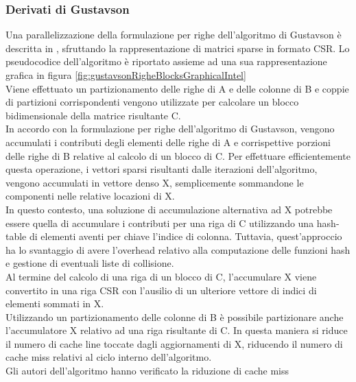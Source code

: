 \subsubsection{Derivati di Gustavson} \label{ssec:gustavsonDerivate}
Una parallelizzazione della formulazione per righe dell'algoritmo di Gustavson è
descritta in \cite{intelSpMMDenseAccumulator}, sfruttando la
rappresentazione di matrici sparse in formato CSR.  \label{ssec:intelSpMMDenseAccumulator}
Lo pseudocodice dell'algoritmo è riportato assieme ad una sua rappresentazione grafica 
in figura \ref{fig:gustavsonRigheBlocksGraphicalIntel}\\
Viene effettuato un partizionamento delle righe di A e delle colonne di B e 
coppie di partizioni corrispondenti vengono utilizzate per calcolare un
blocco bidimensionale della matrice risultante C.\\
\voidLine
In accordo con la formulazione per righe dell'algoritmo di Gustavson, vengono
accumulati i contributi degli elementi \nnz delle righe di A e corrispettive porzioni
delle righe di B relative al calcolo di un blocco di C. 
Per effettuare efficientemente questa operazione, i vettori sparsi risultanti
dalle iterazioni dell'algoritmo, vengono accumulati in vettore denso X, 
semplicemente sommandone le componenti \nnz nelle relative locazioni di X.\\
\voidLine
In questo contesto, una soluzione di accumulazione alternativa ad X
potrebbe essere quella di accumulare i contributi per una riga di C 
utilizzando una hash-table di elementi aventi per chiave l'indice di colonna. 
Tuttavia, quest'approccio ha lo svantaggio di avere l'overhead relativo alla 
computazione delle funzioni hash e gestione di eventuali liste di collisione.\\
Al termine del calcolo di una riga di un blocco di C, l'accumulare X viene
convertito in una riga CSR con l'ausilio di un ulteriore vettore di indici di
elementi \nnz sommati in X.\\
\voidLine
Utilizzando un partizionamento delle colonne di B è possibile partizionare anche
l'accumulatore X relativo ad una riga risultante di C. In questa maniera si
riduce il numero di cache line toccate dagli aggiornamenti di X, riducendo il
numero di cache miss relativi al ciclo interno dell'algoritmo.\\
Gli autori dell'algoritmo hanno verificato la riduzione di cache miss
